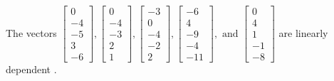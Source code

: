 \begin{exercise}
\begin{exerciseStatement}
  \end{exerciseStatement}
  \begin{exerciseAnswer}
   The vectors \(\left[\begin{array}{r}
0 \\
-4 \\
-5 \\
3 \\
-6
\end{array}\right] , \left[\begin{array}{r}
0 \\
-4 \\
-3 \\
2 \\
1
\end{array}\right] , \left[\begin{array}{r}
-3 \\
0 \\
-4 \\
-2 \\
2
\end{array}\right] , \left[\begin{array}{r}
-6 \\
4 \\
-9 \\
-4 \\
-11
\end{array}\right] , \text{ and } \left[\begin{array}{r}
0 \\
4 \\
1 \\
-1 \\
-8
\end{array}\right]\) are 
  	 linearly dependent  .
  


  \end{exerciseAnswer}
\end{exercise}